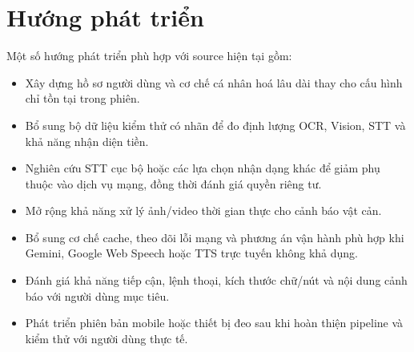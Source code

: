 \section{Hướng phát triển}

Một số hướng phát triển phù hợp với source hiện tại gồm:
\begin{itemize}[leftmargin=1.6em, itemsep=2pt]
  \item Xây dựng hồ sơ người dùng và cơ chế cá nhân hoá lâu dài thay cho cấu hình chỉ tồn tại trong phiên.
  \item Bổ sung bộ dữ liệu kiểm thử có nhãn để đo định lượng OCR, Vision, STT và khả năng nhận diện tiền.
  \item Nghiên cứu STT cục bộ hoặc các lựa chọn nhận dạng khác để giảm phụ thuộc vào dịch vụ mạng, đồng thời đánh giá quyền riêng tư.
  \item Mở rộng khả năng xử lý ảnh/video thời gian thực cho cảnh báo vật cản.
  \item Bổ sung cơ chế cache, theo dõi lỗi mạng và phương án vận hành phù hợp khi Gemini, Google Web Speech hoặc TTS trực tuyến không khả dụng.
  \item Đánh giá khả năng tiếp cận, lệnh thoại, kích thước chữ/nút và nội dung cảnh báo với người dùng mục tiêu.
  \item Phát triển phiên bản mobile hoặc thiết bị đeo sau khi hoàn thiện pipeline và kiểm thử với người dùng thực tế.
\end{itemize}

